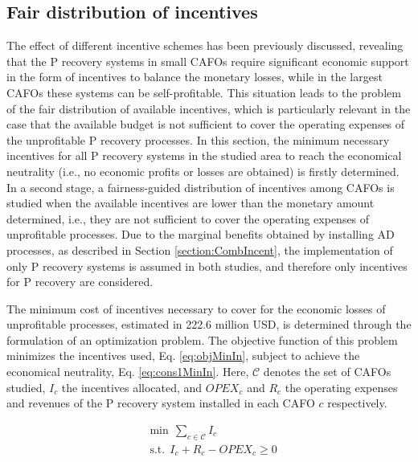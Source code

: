 \begin{refsection}[referencesCh5]
\subsection{Fair distribution of incentives}
The effect of different incentive schemes has been previously discussed, revealing that the P recovery systems in small CAFOs require significant economic support in the form of incentives to balance the monetary losses, while in the largest CAFOs these systems can be self-profitable. This situation leads to the problem of the fair distribution of available incentives, which is particularly relevant in the case that the available budget is not sufficient to cover the operating expenses of the unprofitable P recovery processes. In this section, the minimum necessary incentives for all P recovery systems in the studied area to reach the economical neutrality (i.e., no economic profits or losses are obtained) is firstly determined. In a second stage, a fairness-guided distribution of incentives among CAFOs is studied when the available incentives are lower than the monetary amount determined, i.e., they are not sufficient to cover the operating expenses of unprofitable processes. Due to the marginal benefits obtained by installing AD processes, as described in Section \ref{section:CombIncent}, the implementation of only P recovery systems is assumed in both studies, and therefore only incentives for P recovery are considered.

The minimum cost of incentives necessary
to cover for the economic losses of unprofitable processes, estimated in 222.6 million USD, is determined through the formulation of an optimization problem. The objective function of this problem minimizes the incentives used, Eq. \ref{eq:objMinIn}, subject to achieve the economical neutrality, Eq. \ref{eq:cons1MinIn}. Here, $\mathcal{C}$ denotes the set of CAFOs studied, $I_{c}$ the  incentives allocated, and $OPEX_{c}$ and $R_{c}$ the operating expenses and revenues of the P recovery system installed in each CAFO $c$ respectively.

\begin{subequations}
	\begin{align}
	& \text{min} \ \ \sum_{c \in \mathcal{C}} I_{c}  \label{eq:objMinIn} \\
	& \text{s.t.} \ \ I_{c} + R_{c} - OPEX_{c} \geq 0 \label{eq:cons1MinIn}
	\end{align}
\end{subequations}


\end{refsection}
